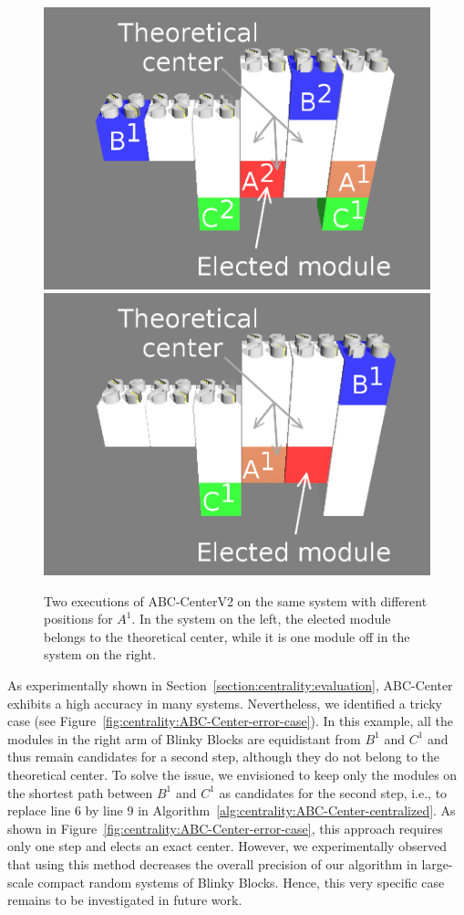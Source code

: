 \begin{figure}[!h]
	\centering
	\includegraphics[width=0.33\linewidth]{images/centrality/abc-centerv2-zones/2-cropped-annotated}
	\includegraphics[width=0.33\linewidth]{images/centrality/abc-centerv2-zones/1-cropped-annotated}
	\caption{Two executions of ABC-CenterV2 on the same system with different positions for $A^1$. In the system on the left, the elected module belongs to the theoretical center, while it is one module off in the system on the right.}
	\label{fig:centrality:abc-center-v2-error-a-illustration}
\end{figure}




As experimentally shown in Section~\ref{section:centrality:evaluation}, ABC-Center exhibits a high accuracy in many systems. Nevertheless, we identified a tricky case (see Figure~\ref{fig:centrality:ABC-Center-error-case}). In this example, all the modules in the right arm of Blinky Blocks are equidistant from $B^1$ and $C^1$ and thus remain candidates for a second step, although they do not belong to the theoretical center. To solve the issue, we envisioned to keep only the modules on the shortest path between $B^1$ and $C^1$ as candidates for the second step, i.e., to replace line 6 by line 9 in Algorithm~\ref{alg:centrality:ABC-Center-centralized}. As shown in Figure~\ref{fig:centrality:ABC-Center-error-case}, this approach requires only one step and elects an exact center. However, we experimentally observed that using this method decreases the overall precision of our algorithm in large-scale compact random systems of Blinky Blocks. Hence, this very specific case remains to be investigated in future work.

